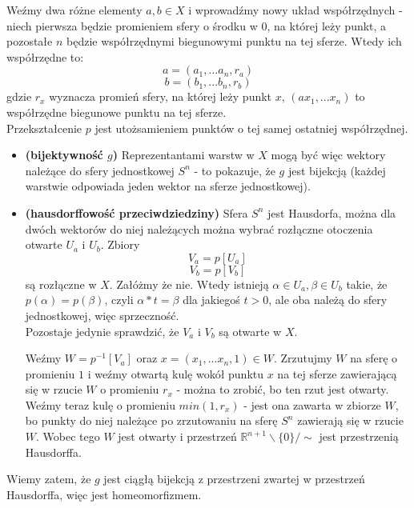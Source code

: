 Weźmy dwa różne elementy $ a, b \in X $ i wprowadźmy nowy układ współrzędnych - niech pierwsza będzie promieniem sfery o środku w $0$, na której leży punkt, a pozostałe $n$ będzie współrzędnymi biegunowymi punktu na tej sferze. Wtedy ich współrzędne to:
$$
a = (a_1, ... a_n, r_a)
$$
$$
b = (b_1, ... b_n, r_b)
$$
gdzie $ r_x $ wyznacza promień sfery, na której leży punkt $ x $, $ (a x_1, ... x_n) $ to współrzędne biegunowe punktu na tej sferze.\\
Przekształcenie $p$ jest utożsamieniem punktów o tej samej ostatniej współrzędnej.
\begin{itemize}
\item \textbf{(bijektywność $g$)} Reprezentantami warstw w $X$ mogą być więc wektory należące do sfery jednostkowej $S^n$ - to pokazuje, że $g$ jest bijekcją (każdej warstwie odpowiada jeden wektor na sferze jednostkowej).
\item \textbf{(hausdorffowość przeciwdziedziny)} Sfera $S^n$ jest Hausdorfa, można dla dwóch wektorów do niej należących można wybrać rozłączne otoczenia otwarte $U_a$ i $U_b$.
Zbiory
$$
V_a = p[U_a]
$$
$$
V_b = p[V_b]
$$
są rozłączne w $X$. Załóżmy że nie. Wtedy istnieją $ \alpha \in U_a, \beta \in U_b $ takie, że $ p(\alpha) = p(\beta) $, czyli $\alpha * t = \beta$ dla jakiegoś $t > 0$, ale oba należą do sfery jednostkowej, więc sprzeczność.\\
Pozostaje jedynie sprawdzić, że $V_a$ i $V_b$ są otwarte w $X$.

Weźmy $ W = p^{-1}[V_a] $ oraz $ x = (x_1, ... x_n, 1) \in W $. Zrzutujmy $W$ na sferę o promieniu $1$ i weźmy otwartą kulę wokół punktu $x$ na tej sferze zawierającą się w rzucie $W$ o promieniu $r_x$ - można to zrobić, bo ten rzut jest otwarty. \\
Weźmy teraz kulę o promieniu $min(1, r_x)$ - jest ona zawarta w zbiorze $W$, bo punkty do niej należące po zrzutowaniu na sferę $S^n$ zawierają się w rzucie $W$. Wobec tego $W$ jest otwarty i przestrzeń  $\mathbb{R}^{n+1} \backslash \{0\} / \sim$  jest przestrzenią Hausdorffa.
\end{itemize}

Wiemy zatem, że $g$ jest ciągłą bijekcją z przestrzeni zwartej w przestrzeń Hausdorffa, więc jest homeomorfizmem.

